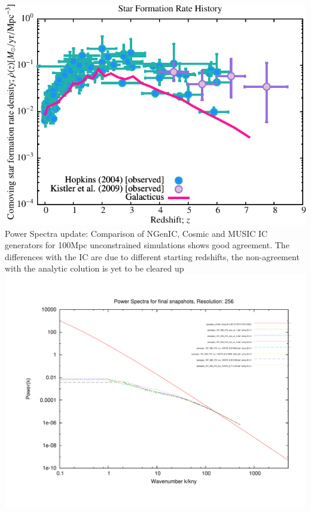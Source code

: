 \documentclass[a4paper,11pt,fleqn,oneside]{book}
\begin{document}
\begin{itemize}
\includegraphics[scale=0.75]{r256/h70/nestages12_SL2/Plot_Star_Formation_History.pdf} \\
Power Spectra update: Comparison of NGenIC, Cosmic and MUSIC IC generators 
for 100Mpc unconstrained simulations shows good agreement. 
The differences with the IC are due to different starting redshifts, the 
non-agreement with the analytic colution is yet to be cleared up \\
\includegraphics[scale=0.45]{analysis/powerspectra/100MPcSimsComparison/fin_powspec_combined_256_h70.pdf} \\

\end{itemize}
\end{document}
